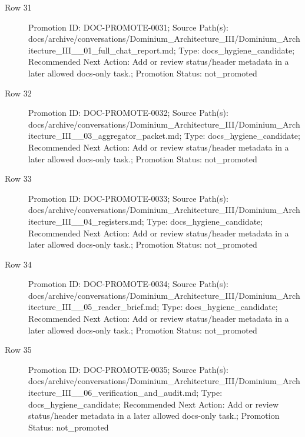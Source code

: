 \documentclass[10.5pt,a4paper,openany]{book}
\begin{document}
\begin{description}
\item[Row 31] Promotion ID: DOC-\allowbreak{}PROMOTE-\allowbreak{}0031; Source Path(s): docs/\allowbreak{}archive/\allowbreak{}conversations/\allowbreak{}Dominium\_\allowbreak{}Architecture\_\allowbreak{}III/\allowbreak{}Dominium\_\allowbreak{}Architecture\_\allowbreak{}III\_\allowbreak{}\_\allowbreak{}01\_\allowbreak{}full\_\allowbreak{}chat\_\allowbreak{}report.\allowbreak{}md; Type: docs\_\allowbreak{}hygiene\_\allowbreak{}candidate; Recommended Next Action: Add or review status/\allowbreak{}header metadata in a later allowed docs-\allowbreak{}only task.\allowbreak{}; Promotion Status: not\_\allowbreak{}promoted
\item[Row 32] Promotion ID: DOC-\allowbreak{}PROMOTE-\allowbreak{}0032; Source Path(s): docs/\allowbreak{}archive/\allowbreak{}conversations/\allowbreak{}Dominium\_\allowbreak{}Architecture\_\allowbreak{}III/\allowbreak{}Dominium\_\allowbreak{}Architecture\_\allowbreak{}III\_\allowbreak{}\_\allowbreak{}03\_\allowbreak{}aggregator\_\allowbreak{}packet.\allowbreak{}md; Type: docs\_\allowbreak{}hygiene\_\allowbreak{}candidate; Recommended Next Action: Add or review status/\allowbreak{}header metadata in a later allowed docs-\allowbreak{}only task.\allowbreak{}; Promotion Status: not\_\allowbreak{}promoted
\item[Row 33] Promotion ID: DOC-\allowbreak{}PROMOTE-\allowbreak{}0033; Source Path(s): docs/\allowbreak{}archive/\allowbreak{}conversations/\allowbreak{}Dominium\_\allowbreak{}Architecture\_\allowbreak{}III/\allowbreak{}Dominium\_\allowbreak{}Architecture\_\allowbreak{}III\_\allowbreak{}\_\allowbreak{}04\_\allowbreak{}registers.\allowbreak{}md; Type: docs\_\allowbreak{}hygiene\_\allowbreak{}candidate; Recommended Next Action: Add or review status/\allowbreak{}header metadata in a later allowed docs-\allowbreak{}only task.\allowbreak{}; Promotion Status: not\_\allowbreak{}promoted
\item[Row 34] Promotion ID: DOC-\allowbreak{}PROMOTE-\allowbreak{}0034; Source Path(s): docs/\allowbreak{}archive/\allowbreak{}conversations/\allowbreak{}Dominium\_\allowbreak{}Architecture\_\allowbreak{}III/\allowbreak{}Dominium\_\allowbreak{}Architecture\_\allowbreak{}III\_\allowbreak{}\_\allowbreak{}05\_\allowbreak{}reader\_\allowbreak{}brief.\allowbreak{}md; Type: docs\_\allowbreak{}hygiene\_\allowbreak{}candidate; Recommended Next Action: Add or review status/\allowbreak{}header metadata in a later allowed docs-\allowbreak{}only task.\allowbreak{}; Promotion Status: not\_\allowbreak{}promoted
\item[Row 35] Promotion ID: DOC-\allowbreak{}PROMOTE-\allowbreak{}0035; Source Path(s): docs/\allowbreak{}archive/\allowbreak{}conversations/\allowbreak{}Dominium\_\allowbreak{}Architecture\_\allowbreak{}III/\allowbreak{}Dominium\_\allowbreak{}Architecture\_\allowbreak{}III\_\allowbreak{}\_\allowbreak{}06\_\allowbreak{}verification\_\allowbreak{}and\_\allowbreak{}audit.\allowbreak{}md; Type: docs\_\allowbreak{}hygiene\_\allowbreak{}candidate; Recommended Next Action: Add or review status/\allowbreak{}header metadata in a later allowed docs-\allowbreak{}only task.\allowbreak{}; Promotion Status: not\_\allowbreak{}promoted

\end{description}
\end{document}
